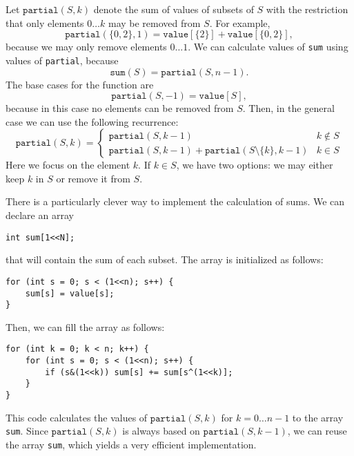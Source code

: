 Let $\texttt{partial}(S,k)$ denote the sum of
values of subsets of $S$ with the restriction
that only elements $0 \ldots k$
may be removed from $S$.
For example,
\[\texttt{partial}(\{0,2\},1)=\texttt{value}[\{2\}]+\texttt{value}[\{0,2\}],\]
because we may only remove elements $0 \ldots 1$.
We can calculate values of \texttt{sum} using
values of \texttt{partial}, because
\[\texttt{sum}(S) = \texttt{partial}(S,n-1).\]
The base cases for the function are
\[\texttt{partial}(S,-1)=\texttt{value}[S],\]
because in this case no elements can be removed from $S$.
Then, in the general case we can use the following recurrence:
\begin{equation*}
    \texttt{partial}(S,k) = \begin{cases}
               \texttt{partial}(S,k-1) & k \notin S \\
               \texttt{partial}(S,k-1) + \texttt{partial}(S \setminus \{k\},k-1) & k \in S
           \end{cases}
\end{equation*}
Here we focus on the element $k$.
If $k \in S$, we have two options: we may either keep $k$ in $S$
or remove it from $S$.

There is a particularly clever way to implement the
calculation of sums. We can declare an array
\begin{lstlisting}
int sum[1<<N];
\end{lstlisting}
that will contain the sum of each subset.
The array is initialized as follows:
\begin{lstlisting}
for (int s = 0; s < (1<<n); s++) {
    sum[s] = value[s];
}
\end{lstlisting}
Then, we can fill the array as follows:
\begin{lstlisting}
for (int k = 0; k < n; k++) {
    for (int s = 0; s < (1<<n); s++) {
        if (s&(1<<k)) sum[s] += sum[s^(1<<k)];
    }
}
\end{lstlisting}
This code calculates the values of $\texttt{partial}(S,k)$
for $k=0 \ldots n-1$ to the array \texttt{sum}.
Since $\texttt{partial}(S,k)$ is always based on
$\texttt{partial}(S,k-1)$, we can reuse the array
\texttt{sum}, which yields a very efficient implementation.
